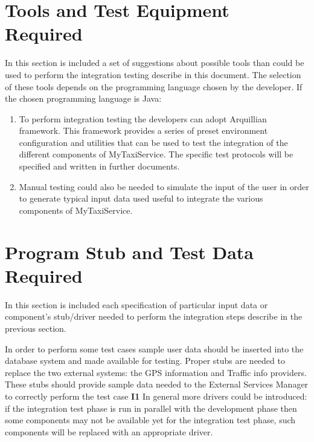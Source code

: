 \documentclass[11pt,titlepage]{article} %
\begin{document}
\newpage

\section{Tools and Test Equipment Required}
  In this section is included a set of suggestions about possible tools than could be used to perform the integration 
  testing describe in this document.\newline
  The selection of these tools depends on the programming language chosen by the developer.\newline
  If the chosen programming language is Java:
  \begin{enumerate}
   \item To perform integration testing the developers can adopt Arquillian framework. This framework provides a series of preset
	 environment configuration and utilities that can be used to test the integration of the different components of MyTaxiService.
	 The specific test protocols will be specified and written in further documents.
   \item Manual testing could also be needed to simulate the input of the user in order to generate typical
	 input data used useful to integrate the various components of MyTaxiService.
  \end{enumerate}

\section{Program Stub and Test Data Required}
  In this section is included each specification of particular input data or component's stub/driver needed to 
  perform the integration steps describe in the previous section.\newline
  
  \noindent In order to perform some test cases sample user data should be inserted into the database system and made available for testing.\newline
  Proper stubs are needed to replace the two external systems: the GPS information and Traffic info providers.
  These stubs should provide sample data needed to the External Services Manager to correctly perform the test case \textbf{I1} \newline
  In general more drivers could be introduced: if the integration test phase is run in parallel with the development phase then some components may not
  be available yet for the integration test phase, such components will be replaced with an appropriate driver.
  
\end{document}
